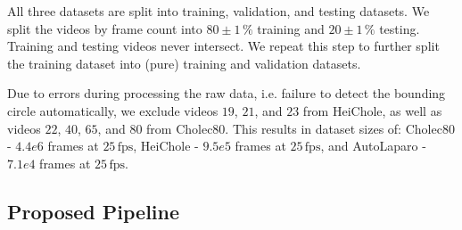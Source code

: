All three datasets are split into training, validation, and testing datasets. We split the videos by frame count into $80\pm 1\,\%$ training and $20 \pm 1\,\%$ testing. Training and testing videos never intersect. We repeat this step to further split the training dataset into (pure) training and validation datasets.

Due to errors during processing the raw data, i.e. failure to detect the bounding circle automatically, we exclude videos $19$, $21$, and $23$ from HeiChole, as well as videos $22$, $40$, $65$, and $80$ from Cholec80. This results in dataset sizes of: Cholec80 - $4.4e6$ frames at $25\,\text{fps}$, HeiChole - $9.5e5$ frames at $25\,\text{fps}$, and AutoLaparo - $7.1e4$ frames at $25\,\text{fps}$.


\subsection{Proposed Pipeline}
\label{c4:sec:proposed_pipeline}


